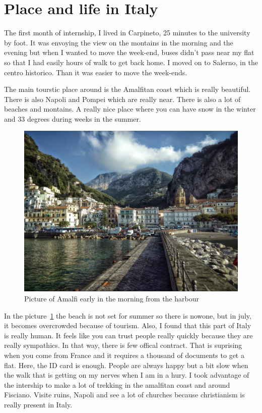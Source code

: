 \documentclass[english,a4paper,11pt]{report}
\begin{document}
 \section{Place and life in Italy}
 
 \par The first month of internship, I lived in Carpineto, 25 minutes to the university by foot. It was envoying the view on the montains in the morning and the evening but when I wanted to move the week-end, buses didn't pass near my flat so that I had easily hours of walk to get back home. I moved on to Salerno, in the centro historico. Than it was easier to move the week-ends. 
 \par The main tourstic place around is the Amalfitan coast which is really beautiful. There is also Napoli and Pompei which are really near. There is also a lot of beaches and montains. A really nice place where you can have snow in the winter and 33 degrees during weeks in the summer. 
  \begin{figure}[h]
 \begin{center}
	 \includegraphics[width=12cm]{images_not_compressed/amalfi.jpg}
		\caption{Picture of Amalfi early in the morning from the harbour}
		\label{amalfi}
	 \end{center}
 \end{figure}

 \par In the picture~\ref{amalfi} the beach is not set for summer so there is nowone, but in july, it becomes overcrowded because of tourism. Also, I found that this part of Italy is really human. It feels like you can trust people really quickly because they are really sympathics. In that way, there is few offical contract. That is suprising when you come from France and it requires a thousand of documents to get a flat. Here, the ID card is enough. People are always happy but a bit slow when the walk that is getting on my nerves when I am in a hury.
 I took advantage of the intership to make a lot of trekking in the amalfitan coast and around Fisciano. Visite ruins, Napoli and see a lot of churches because christianism is really present in Italy.
	
	
	
	
\end{document}
